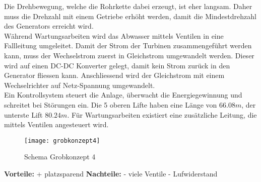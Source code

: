 Die Drehbewegung, welche die Rohrkette dabei erzeugt, ist eher langsam. Daher muss die Drehzahl mit einem Getriebe erhöht werden, damit die Mindestdrehzahl des Generators erreicht wird.\\
Während Wartungsarbeiten wird das Abwasser mittels Ventilen in eine Fallleitung umgeleitet. Damit der Strom der Turbinen zusammengeführt werden kann, muss der Wechselstrom zuerst in Gleichstrom umgewandelt werden. Dieser wird auf einen DC-DC Konverter gelegt, damit kein Strom zurück in den Generator fliessen kann. Anschliessend wird der Gleichstrom mit einem Wechselrichter auf Netz-Spannung umgewandelt.\\
Ein Kontrollsystem steuert die Anlage, überwacht die Energiegewinnung und schreitet bei Störungen ein. Die 5 oberen Lifte haben eine Länge von \(66.08m\), der unterste Lift \(80.24m\). Für Wartungsarbeiten existiert eine zusätzliche Leitung, die mittels Ventilen angesteuert wird.
\newpage
\begin{wrapfigure}{r}{0.5\textwidth}
  \begin{center}
    \texttt{[image: grobkonzept4]}
  \end{center}
  \caption{Schema Grobkonzept 4}
\end{wrapfigure}


\textbf{Vorteile:}							\newline
+ 	platzsparend								\newline
\newline
\textbf{Nachteile:}\newline
-	viele Ventile								\newline
-	Lufwiderstand							\newline
\WFclear			
\newpage